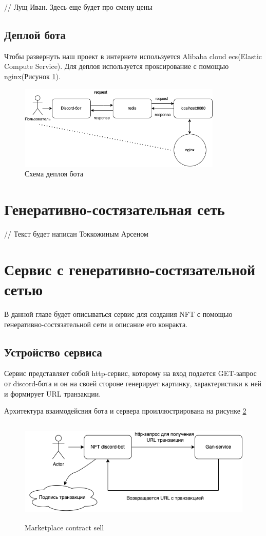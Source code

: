 // Лущ Иван. Здесь еще будет про смену цены


\subsection{Деплой бота}
	Чтобы развернуть наш проект в интернете используется Alibaba cloud ecs(Elastic Compute Service). Для деплоя используется проксирование с помощью nginx(Рисунок {\color{blue} \ref{fig.nginxganservice}}).
	\begin{figure}[H]
		\centering
		\includegraphics[height=40mm]{fig/nginxganservice.png}
		\caption{Схема деплоя бота}
        \label{fig.nginxganservice}
	\end{figure}

\section{Генеративно-состязательная сеть}
\label{section.6}
// Текст будет написан Токкожиным Арсеном
\section{Сервис с генеративно-состязательной сетью}
\label{section.ganservice}
  В данной главе будет описываться сервис для создания NFT с помощью генеративно-состязательной сети и описание его конракта.
\subsection{Устройство сервиса}

	Сервис представляет собой http-сервис, которому на вход подается GET-запрос от discord-бота и он на своей стороне генерирует картинку, характеристики к ней и формирует URL транзакции.

	Архитектура взаимодейсвия бота и сервера проиллюстрирована на рисунке {\color{blue} \ref{fig.ganservice}}
	\begin{figure}[H]
		\centering
		\includegraphics[height=50mm]{fig/gan-service.png}
		\caption{Marketplace contract sell}
		\label{fig.ganservice}
	\end{figure}


